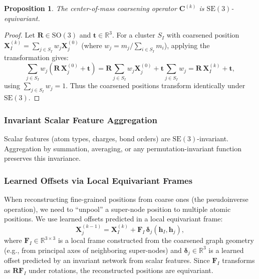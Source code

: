 \documentclass[12pt,a4paper]{article}
\newtheorem{proposition}[theorem]{Proposition}
\providecommand{\R}{}
\renewcommand{\R}{\mathbb{R}}
\newcommand{\bh}{\bm{h}}
\begin{document}
\begin{proposition}\label{prop:com_equivariance}
The center-of-mass coarsening operator $\bm{C}^{(k)}$ is $\mathrm{SE}(3)$-equivariant.
\end{proposition}
\begin{proof}
Let $\bm{R} \in \mathrm{SO}(3)$ and $\bm{t} \in \R^3$. For a cluster $S_I$ with coarsened position $\bm{X}^{(k)}_I = \sum_{j \in S_I} w_j \bm{X}^{(0)}_j$ (where $w_j = m_j / \sum_{i \in S_I} m_i$), applying the transformation gives:
\begin{equation}
    \sum_{j \in S_I} w_j (\bm{R}\, \bm{X}^{(0)}_j + \bm{t}) = \bm{R} \sum_{j \in S_I} w_j \bm{X}^{(0)}_j + \bm{t} \sum_{j \in S_I} w_j = \bm{R}\, \bm{X}^{(k)}_I + \bm{t},
\end{equation}
using $\sum_{j \in S_I} w_j = 1$. Thus the coarsened positions transform identically under $\mathrm{SE}(3)$.
\end{proof}

\subsubsection{Invariant Scalar Feature Aggregation}

Scalar features (atom types, charges, bond orders) are $\mathrm{SE}(3)$-invariant. Aggregation by summation, averaging, or any permutation-invariant function preserves this invariance.

\subsubsection{Learned Offsets via Local Equivariant Frames}

When reconstructing fine-grained positions from coarse ones (the pseudoinverse operation), we need to ``unpool'' a super-node position to multiple atomic positions. We use learned offsets predicted in a local equivariant frame:
\begin{equation}\label{eq:local_frame}
    \bm{X}^{(k-1)}_j = \bm{X}^{(k)}_I + \bm{F}_I\, \bm{\delta}_j(\bh_I, \bh_j),
\end{equation}
where $\bm{F}_I \in \R^{3 \times 3}$ is a local frame constructed from the coarsened graph geometry (e.g., from principal axes of neighboring super-nodes) and $\bm{\delta}_j \in \R^3$ is a learned offset predicted by an invariant network from scalar features. Since $\bm{F}_I$ transforms as $\bm{R}\bm{F}_I$ under rotations, the reconstructed positions are equivariant.
\end{document}
